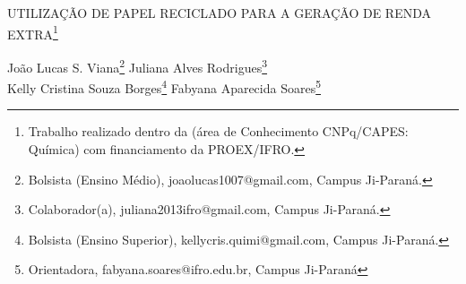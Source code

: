 \documentclass[article,12pt,onesidea,4paper,english,brazil]{abntex2}
\begin{document}
	
	
	\frenchspacing 
	
	\begin{center}
		\LARGE UTILIZAÇÃO DE PAPEL RECICLADO PARA A GERAÇÃO DE RENDA EXTRA\footnote{Trabalho realizado dentro da (área de Conhecimento CNPq/CAPES: Química) com financiamento da PROEX/IFRO.}
		
		\normalsize
		João Lucas S. Viana\footnote{Bolsista (Ensino Médio), joaolucas1007@gmail.com, Campus Ji-Paraná.} 
		Juliana Alves Rodrigues\footnote{Colaborador(a), juliana2013ifro@gmail.com, Campus Ji-Paraná.} \\
		Kelly Cristina Souza Borges\footnote{Bolsista (Ensino Superior), kellycris.quimi@gmail.com, Campus Ji-Paraná.} 
		Fabyana Aparecida Soares\footnote{Orientadora, fabyana.soares@ifro.edu.br, Campus Ji-Paraná} 
	\end{center}
	
\end{document}

